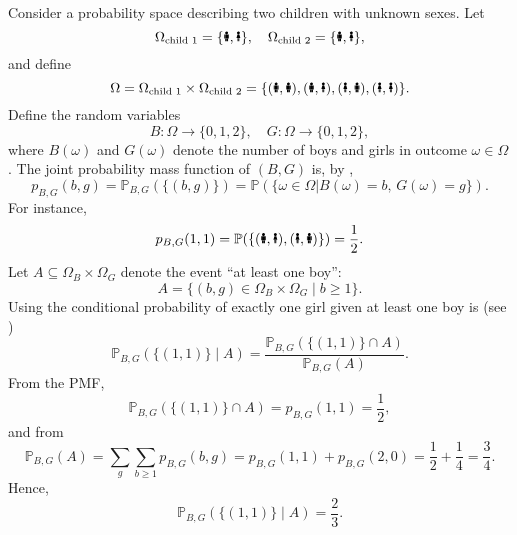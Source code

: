 \begin{example}
	Consider a probability space describing two children with unknown sexes. Let
	\begin{equation}
		\Omega_{\text{child 1}} = \{\text{\Gentsroom}, \text{\Ladiesroom}\}, \quad
		\Omega_{\text{child 2}} = \{\text{\Gentsroom}, \text{\Ladiesroom}\},
	\end{equation}
	and define
	\begin{equation}
		\Omega = \Omega_{\text{child 1}} \times \Omega_{\text{child 2}} = 
		\{(\text{\Gentsroom},\text{\Gentsroom}), (\text{\Gentsroom},\text{\Ladiesroom}), (\text{\Ladiesroom},\text{\Gentsroom}), (\text{\Ladiesroom},\text{\Ladiesroom})\}.
	\end{equation}	
	Define the random variables
	\begin{equation}
		B \colon \Omega \to \{0,1,2\}, \quad G \colon \Omega \to \{0,1,2\},
	\end{equation}
	where $B(\omega)$ and $G(\omega)$ denote the number of boys and girls in outcome $\omega \in \Omega$.  
	The joint probability mass function of $(B,G)$ is, by ,
	\begin{equation}
		p_{B,G}(b,g) = \mathbb{P}_{B,G}(\{(b,g)\}) = \mathbb{P}(\{\omega \in \Omega | B(\omega) = b,\, G(\omega) = g\}).
	\end{equation}
	For instance,
	\begin{equation}
		p_{B,G}(1,1) = \mathbb{P}(\{(\text{\Gentsroom},\text{\Ladiesroom}), (\text{\Ladiesroom},\text{\Gentsroom})\}) = \frac{1}{2}.
	\end{equation}
	Let $A \subseteq \Omega_B \times \Omega_G$ denote the event ``at least one boy'':
	\begin{equation}
		A = \{(b,g) \in \Omega_B \times \Omega_G \mid b \ge 1\}.
	\end{equation}
	Using  the conditional probability of exactly one girl given at least one boy is (see )
	\begin{equation}
		\mathbb{P}_{B,G}(\{(1,1)\} \mid A) = \frac{\mathbb{P}_{B,G}(\{(1,1)\} \cap A)}{\mathbb{P}_{B,G}(A)}.
	\end{equation}
	From the PMF,
	\begin{equation}
		\mathbb{P}_{B,G}(\{(1,1)\} \cap A) = p_{B,G}(1,1) = \frac{1}{2},
	\end{equation}
	and from 
	\begin{equation}
		\mathbb{P}_{B,G}(A) = \sum_{g} \sum_{b \ge 1} p_{B,G}(b,g) = p_{B,G}(1,1) + p_{B,G}(2,0) = \frac{1}{2} + \frac{1}{4} = \frac{3}{4}.
	\end{equation}
	Hence,
	\begin{equation}
		\mathbb{P}_{B,G}(\{(1,1)\} \mid A) = \frac{2}{3}.
	\end{equation}
\end{example}


